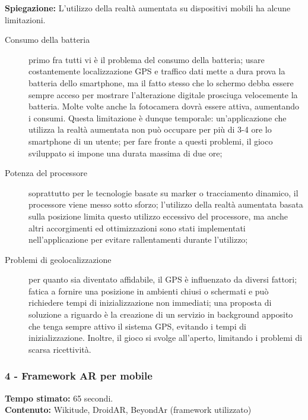 \documentclass[
	twoside]				%
	{toptesi}				%
\begin{document}
	\textbf{Spiegazione:} L'utilizzo della realtà aumentata su dispositivi mobili ha alcune limitazioni.
	
	\begin{description}
		\item[Consumo della batteria] primo fra tutti vi è il problema del consumo della batteria; usare costantemente localizzazione GPS e traffico dati mette a dura prova la batteria dello smartphone, ma il fatto stesso che lo schermo debba essere sempre acceso per mostrare l'alterazione digitale prosciuga velocemente la batteria. Molte volte anche la fotocamera dovrà essere attiva, aumentando i consumi.
		Questa limitazione è dunque temporale: un'applicazione che utilizza la realtà aumentata non può occupare per più di 3-4 ore lo smartphone di un utente; per fare fronte a questi problemi, il gioco sviluppato si impone una durata massima di due ore;
		
		\item[Potenza del processore] soprattutto per le tecnologie basate su marker o tracciamento dinamico, il processore viene messo sotto sforzo; l'utilizzo della realtà aumentata basata sulla posizione limita questo utilizzo eccessivo del processore, ma anche altri accorgimenti ed ottimizzazioni sono stati implementati nell'applicazione per evitare rallentamenti durante l'utilizzo;
		
		\item[Problemi di geolocalizzazione] per quanto sia diventato affidabile, il GPS è influenzato da diversi fattori; fatica a fornire una posizione in ambienti chiusi o schermati e può richiedere tempi di inizializzazione non immediati; una proposta di soluzione a riguardo è la creazione di un servizio in background apposito che tenga sempre attivo il sistema GPS, evitando i tempi di inizializzazione. Inoltre, il gioco si svolge all'aperto, limitando i problemi di scarsa ricettività.  
	\end{description}
	
	\subsubsection{4 - Framework AR per mobile}
	
	\textbf{Tempo stimato:} 65 secondi. \\
	
	\textbf{Contenuto:} Wikitude, DroidAR, BeyondAr (framework utilizzato) \\
	
\end{document}
